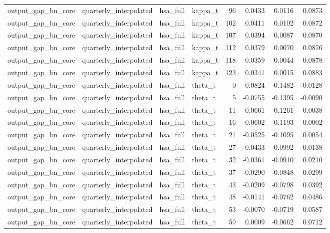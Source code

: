 \begin{tabular}{llllrrrr}
output\_gap\_bn\_core & quarterly\_interpolated & hsa\_full & kappa\_t & 96 & 0.0433 & 0.0116 & 0.0873 \\
output\_gap\_bn\_core & quarterly\_interpolated & hsa\_full & kappa\_t & 102 & 0.0411 & 0.0102 & 0.0872 \\
output\_gap\_bn\_core & quarterly\_interpolated & hsa\_full & kappa\_t & 107 & 0.0394 & 0.0087 & 0.0870 \\
output\_gap\_bn\_core & quarterly\_interpolated & hsa\_full & kappa\_t & 112 & 0.0379 & 0.0070 & 0.0876 \\
output\_gap\_bn\_core & quarterly\_interpolated & hsa\_full & kappa\_t & 118 & 0.0359 & 0.0044 & 0.0878 \\
output\_gap\_bn\_core & quarterly\_interpolated & hsa\_full & kappa\_t & 123 & 0.0341 & 0.0015 & 0.0883 \\
output\_gap\_bn\_core & quarterly\_interpolated & hsa\_full & theta\_t & 0 & -0.0824 & -0.1482 & -0.0128 \\
output\_gap\_bn\_core & quarterly\_interpolated & hsa\_full & theta\_t & 5 & -0.0755 & -0.1395 & -0.0090 \\
output\_gap\_bn\_core & quarterly\_interpolated & hsa\_full & theta\_t & 11 & -0.0661 & -0.1261 & -0.0038 \\
output\_gap\_bn\_core & quarterly\_interpolated & hsa\_full & theta\_t & 16 & -0.0602 & -0.1193 & 0.0002 \\
output\_gap\_bn\_core & quarterly\_interpolated & hsa\_full & theta\_t & 21 & -0.0525 & -0.1095 & 0.0054 \\
output\_gap\_bn\_core & quarterly\_interpolated & hsa\_full & theta\_t & 27 & -0.0433 & -0.0992 & 0.0138 \\
output\_gap\_bn\_core & quarterly\_interpolated & hsa\_full & theta\_t & 32 & -0.0361 & -0.0910 & 0.0210 \\
output\_gap\_bn\_core & quarterly\_interpolated & hsa\_full & theta\_t & 37 & -0.0290 & -0.0848 & 0.0299 \\
output\_gap\_bn\_core & quarterly\_interpolated & hsa\_full & theta\_t & 43 & -0.0209 & -0.0798 & 0.0392 \\
output\_gap\_bn\_core & quarterly\_interpolated & hsa\_full & theta\_t & 48 & -0.0141 & -0.0762 & 0.0486 \\
output\_gap\_bn\_core & quarterly\_interpolated & hsa\_full & theta\_t & 53 & -0.0070 & -0.0719 & 0.0587 \\
output\_gap\_bn\_core & quarterly\_interpolated & hsa\_full & theta\_t & 59 & 0.0009 & -0.0662 & 0.0712 \\

\end{tabular}
